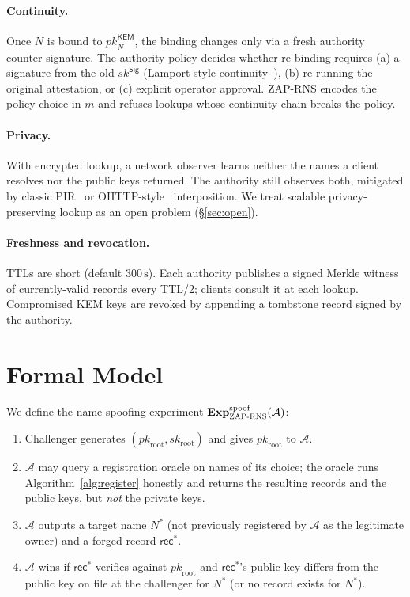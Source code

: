 \documentclass[11pt,a4paper]{article}
\theoremstyle{definition}
\theoremstyle{remark}
\newcommand{\rec}{\mathsf{rec}}
\newcommand{\KEM}{\mathsf{KEM}}
\newcommand{\Sig}{\mathsf{Sig}}
\newcommand{\pk}{\mathit{pk}}
\newcommand{\sk}{\mathit{sk}}
\newcommand{\RNS}{\textsc{ZAP-RNS}}
\begin{document}
\paragraph{Continuity.} Once $N$ is bound to $\pk_N^\KEM$, the binding
changes only via a fresh authority counter-signature. The authority
policy decides whether re-binding requires (a) a signature from the
old $\sk^\Sig$ (Lamport-style continuity~\cite{lamport}), (b) re-running
the original attestation, or (c) explicit operator approval. \RNS{}
encodes the policy choice in $m$ and refuses lookups whose continuity
chain breaks the policy.

\paragraph{Privacy.} With encrypted lookup, a network observer learns
neither the names a client resolves nor the public keys returned. The
authority still observes both, mitigated by classic
PIR~\cite{chor1995pir} or OHTTP-style~\cite{ohttp} interposition. We
treat scalable privacy-preserving lookup as an open problem
(\S\ref{sec:open}).

\paragraph{Freshness and revocation.} TTLs are short (default
$300\,\mathrm{s}$). Each authority publishes a signed Merkle witness
of currently-valid records every TTL/2; clients consult it at each
lookup. Compromised KEM keys are revoked by appending a tombstone
record signed by the authority.

\section{Formal Model}\label{sec:formal}

We define the name-spoofing experiment $\mathbf{Exp}^{\mathrm{spoof}}_{\RNS}(\mathcal{A})$:

\begin{enumerate}[leftmargin=*,label=\arabic*.]
\item Challenger generates $(\pk_{\mathrm{root}}, \sk_{\mathrm{root}})$
and gives $\pk_{\mathrm{root}}$ to $\mathcal{A}$.
\item $\mathcal{A}$ may query a registration oracle on names of its
choice; the oracle runs Algorithm~\ref{alg:register} honestly and
returns the resulting records and the public keys, but \emph{not} the
private keys.
\item $\mathcal{A}$ outputs a target name $N^*$ (not previously
registered by $\mathcal{A}$ as the legitimate owner) and a forged
record $\rec^*$.
\item $\mathcal{A}$ wins if $\rec^*$ verifies against $\pk_{\mathrm{root}}$
and $\rec^*$'s public key differs from the public key on file at the
challenger for $N^*$ (or no record exists for $N^*$).
\end{enumerate}
\end{document}
